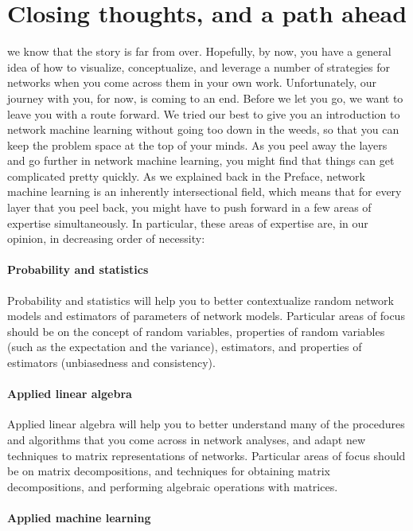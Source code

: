 \section{Closing thoughts, and a path ahead}
\label{sec:ch10:next}

we know that the story is far from over. Hopefully, by now, you have a general idea of how to visualize, conceptualize, and leverage a number of strategies for networks when you come across them in your own work. Unfortunately, our journey with you, for now, is coming to an end. Before we let you go, we want to leave you with a route forward. We tried our best to give you an introduction to network machine learning without going too down in the weeds, so that you can keep the problem space at the top of your minds. As you peel away the layers and go further in network machine learning, you might find that things can get complicated pretty quickly. As we explained back in the Preface, network machine learning is an inherently intersectional field, which means that for every layer that you peel back, you might have to push forward in a few areas of expertise simultaneously. In particular, these areas of expertise are, in our opinion, in decreasing order of necessity:

\paragraph{Probability and statistics}
Probability and statistics will help you to better contextualize random network models and estimators of parameters of network models. Particular areas of focus should be on the concept of random variables, properties of random variables (such as the expectation and the variance), estimators, and properties of estimators (unbiasedness and consistency). 

\paragraph{Applied linear algebra}
Applied linear algebra will help you to better understand many of the procedures and algorithms that you come across in network analyses, and adapt new techniques to matrix representations of networks. Particular areas of focus should be on matrix decompositions, and techniques for obtaining matrix decompositions, and performing algebraic operations with matrices. 

\paragraph{Applied machine learning}

